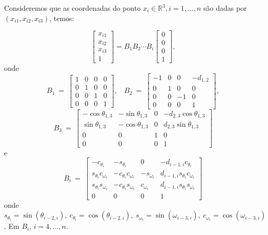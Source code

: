 \documentclass[a4paper,12pt]{article}
\begin{document}
	Consideremos que as coordenadas do ponto $x_{i} \in\mathbb{R}^3,i= 1, ...,n $ são dadas por $(x_{i1},x_{i2},x_{i3})$, temos:
	
	$$
	\begin{bmatrix}
	x_{i1}\\ 
	x_{i2}\\ 
	x_{i3}\\ 
	1
	\end{bmatrix}
	= B_{1}B_{2}\cdots B_{i}\begin{bmatrix}
	0\\ 
	0\\ 
	0\\ 
	1
	\end{bmatrix},
	$$
	onde
	$$
	B_1\: =\:
	\begin{bmatrix}
	1 & 0 & 0 & 0\\ 
	0 & 1 & 0 & 0\\ 
	0 & 0 & 1 & 0\\ 
	0 & 0 & 0 & 1
	\end{bmatrix},\:\:\:
	\: B_2\: =\:
	\begin{bmatrix}
	-1 & 0 & 0 & -d_{1,2}\\
	0 & 1 & 0 & 0\\ 
	0 & 0 & -1 & 0\\ 
	0 & 0 & 0 & 1
	\end{bmatrix},
	$$
	$$
	B_3\:=\:
	\begin{bmatrix}
	-\cos\theta_{1,3} & -\sin\theta_{1,3} & 0 & -d_{2,3}\cos\theta_{1,3}\\ 
	\sin\theta_{1,3} & -\cos\theta_{1,3} & 0 & d_{2,3}\sin\theta_{1,3}\\ 
	0 & 0 & 1 & 0\\ 
	0 & 0 & 0 & 1
	\end{bmatrix}
	$$
	e
	$$
	B_i\:=\:
	\begin{bmatrix}
	-c_{\theta_{i}} & -s_{\theta_{i}} & 0 & -d_{i-1,i}c_{\theta_{i}}\\ 
	s_{\theta_{i}}c_{\omega_{i}} & -c_{\theta_{i}}c_{\omega_{i}}
	& -s_{\omega_{i}} & d_{i-1,i}s_{\theta_{i}}c_{\omega_{i}}\\ 
	s_{\theta_{i}}s_{\omega_{i}} & -c_{\theta_{i}}s_{\omega_{i}} & c_{\omega_{i}} & d_{i-1,i}s_{\theta_{i}}s_{\omega_{i}}\\ 
	0 & 0 & 0 & 1
	\end{bmatrix}
	$$
	onde $s_{\theta_{i}}=\sin (\theta_{i-2, i}),\: c_{\theta_{i}}=\cos (\theta_{i-2, i}),\: s_{\omega_{i}}=\sin (\omega_{i-3, i}),\: c_{\omega_{i}}=\cos (\omega_{i-3, i})$. Em $B_i$, $i=4, ..., n$.
	
\end{document}
